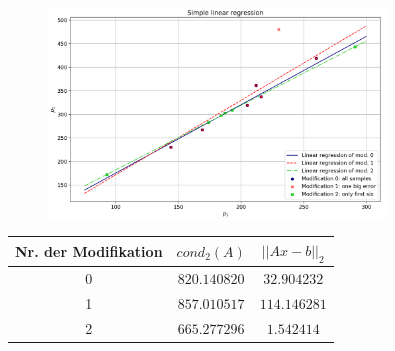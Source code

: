\documentclass{beamer}
\begin{document}
\begin{frame}
  \begin{figure}
    \centering
      \includegraphics[width=0.8\textwidth]{Linear_Regression}
  \end{figure}
  \vspace{-1em}
  \centering
  \begin{tabular}{c|c|c}
    Nr. der Modifikation & $cond_2(A)$   & $||Ax-b||_2$\\ \hline
                       0 & $820.140820$  & $32.904232$\\ \hline
                       1 & $857.010517$  & $114.146281$\\ \hline
                       2 & $665.277296$  & $1.542414$
  \end{tabular}
\end{frame}
\end{document}
